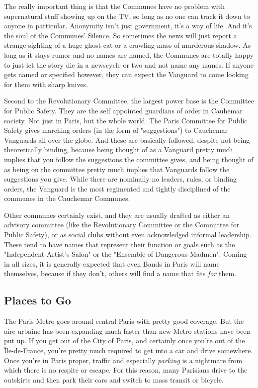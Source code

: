 The really important thing is that the Communes have no problem with supernatural stuff showing up on the TV, so long as no one can track it down to anyone in particular. Anonymity isn't just government, it's a way of life. And it's the soul of the Communes' Silence. So sometimes the news will just report a strange sighting of a huge ghost cat or a crawling mass of murderous shadow. As long as it stays rumor and no names are named, the Communes are totally happy to just let the story die in a newscycle or two and not name any names. If anyone gets named or specified however, they can expect the Vanguard to come looking for them with sharp knives.

Second to the Revolutionary Committee, the largest power base is the Committee for Public Safety. They are the self appointed guardians of order in Cauhemar society. Not just in Paris, but the whole world. The Paris Committee for Public Safety gives marching orders (in the form of "suggestions") to Cauchemar Vanguards all over the globe. And these are basically followed, despite not being theoretically binding, because being thought of as a Vanguard pretty much implies that you follow the suggestions the committee gives, and being thought of as being on the committee pretty much implies that Vanguards follow the suggestions you give. While there are nominally no leaders, rules, or binding orders, the Vanguard is the most regimented and tightly disciplined of the communes in the Cauchemar Communes.

Other communes certainly exist, and they are usually drafted as either an advisory committee (like the Revolutionary Committee or the Committee for Public Safety), or as social clubs without even acknowledged informal leadership. These tend to have names that represent their function or goals such as the "Independent Artist's Salon" or the "Ensemble of Dangerous Madmen". Coming in all sizes, it is generally expected that even Bands in Paris will name themselves, because if they don't, others will find a name that fits \textit{for} them.

\subsection{Places to Go}

\hspace{\parindent} The Paris Metro goes around central Paris with pretty good coverage. But the aire urbaine has been expanding much faster than new Metro stations have been put up. If you get out of the City of Paris, and certainly once you're out of the \^{I}le-de-France, you're pretty much required to get into a car and drive somewhere. Once you're in Paris proper, traffic and especially \textit{parking} is a nightmare from which there is no respite or escape. For this reason, many Parisians drive to the outskirts and then park their cars and switch to mass transit or bicycle. 

